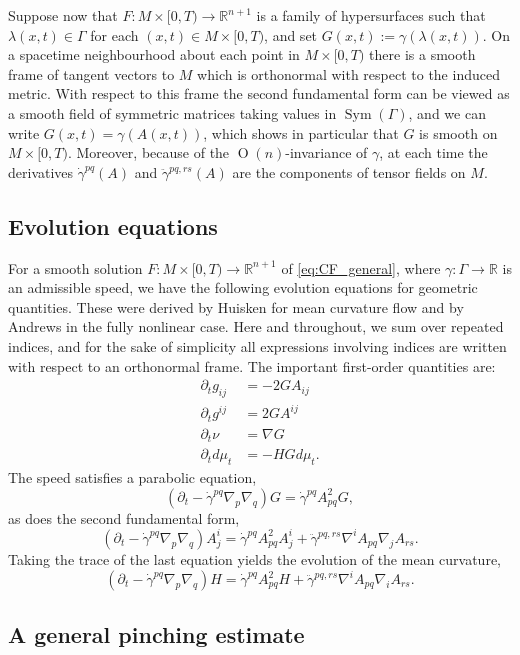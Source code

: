 \documentclass[12pt]{amsart}
\DeclareMathOperator{\sym}{Sym}
\DeclareMathOperator{\orthog}{O}
\begin{document}
Suppose now that $F:M\times[0,T) \to \mathbb{R}^{n+1}$ is a family of hypersurfaces such that $\lambda(x,t) \in \Gamma$ for each $(x,t) \in M\times [0,T)$, and set $G(x,t) := \gamma(\lambda(x,t))$. On a spacetime neighbourhood about each point in $M\times[0,T)$ there is a smooth frame of tangent vectors to $M$ which is orthonormal with respect to the induced metric. With respect to this frame the second fundamental form can be viewed as a smooth field of symmetric matrices taking values in $\sym(\Gamma)$, and we can write $G(x,t) = \gamma(A(x,t))$, which shows in particular that $G$ is smooth on $M \times [0,T)$. Moreover, because of the $\orthog (n)$-invariance of $\gamma$, at each time the derivatives $\dot \gamma^{pq}(A)$ and $\ddot \gamma^{pq,rs}(A)$ are the components of tensor fields on $M$.

\subsection{Evolution equations}
\label{sec:evol_eqs}
For a smooth solution $F:M\times [0,T) \to \mathbb{R}^{n+1}$ of \eqref{eq:CF_general}, where $\gamma : \Gamma \to \mathbb{R}$ is an admissible speed, we have the following evolution equations for geometric quantities. These were derived by Huisken for mean curvature flow \cite{Huisk84} and by Andrews \cite{And94_euclid} in the fully nonlinear case. Here and throughout, we sum over repeated indices, and for the sake of simplicity all expressions involving indices are written with respect to an orthonormal frame.  The important first-order quantities are:
\begin{align*}
\partial_t g_{ij} &= - 2 G A_{ij}\\
\partial_t g^{ij} & = 2 G A^{ij}\\
\partial_t \nu &= \nabla G\\
\partial_t d\mu_t &= - H G d\mu_t.
\end{align*}
The speed satisfies a parabolic equation,
\[(\partial_t - \dot \gamma^{pq} \nabla_p \nabla_q) G =  \dot \gamma^{pq} A^2_{pq} G,\]
as does the second fundamental form,
\[(\partial_t - \dot \gamma^{pq} \nabla_p \nabla_q) A_j^i= \dot \gamma^{pq} A^2_{pq} A^i_j  + \ddot \gamma^{pq,rs} \nabla^i A_{pq} \nabla_j A_{rs}.\]
Taking the trace of the last equation yields the evolution of the mean curvature,
\[(\partial_t - \dot \gamma^{pq} \nabla_p \nabla_q)  H= \dot \gamma^{pq}  A^2_{pq} H  + \ddot \gamma^{pq,rs} \nabla^i A_{pq} \nabla_i A_{rs}.\]

\subsection{A general pinching estimate}
\end{document}
